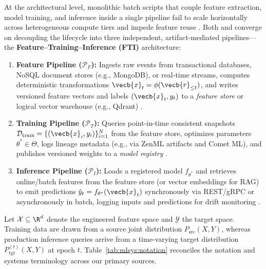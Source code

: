 \documentclass[../../../../master.tex]{subfiles}
\begin{document}
At the architectural level, monolithic batch scripts that couple feature extraction, model training, and inference inside a single pipeline fail to scale horizontally across heterogeneous compute tiers and impede feature reuse . Both  and  converge on decoupling the lifecycle into three independent, artifact-mediated pipelines---the \textbf{Feature--Training--Inference (FTI)} architecture:
\begin{enumerate}
  \item \textbf{Feature Pipeline ($\mathcal{P}_F$):} Ingests raw events from transactional databases, NoSQL document stores (e.g., MongoDB), or real-time streams, computes deterministic transformations $\vecb{x}_t = \phi(\vecb{r}_{\le t})$, and writes versioned feature vectors and labels $(\vecb{x}_t, y_t)$ to a \emph{feature store} or logical vector warehouse (e.g., Qdrant) .
  \item \textbf{Training Pipeline ($\mathcal{P}_T$):} Queries point-in-time consistent snapshots $\mathcal{D}_{\mathrm{train}} = \{(\vecb{x}_i, y_i)\}_{i=1}^N$ from the feature store, optimizes parameters $\theta^* \in \Theta$, logs lineage metadata (e.g., via ZenML artifacts and Comet ML), and publishes versioned weights to a \emph{model registry} .
  \item \textbf{Inference Pipeline ($\mathcal{P}_I$):} Loads a registered model $f_{\theta^*}$ and retrieves online/batch features from the feature store (or vector embeddings for RAG) to emit predictions $\hat{y}_t = f_{\theta^*}(\vecb{x}_t)$ synchronously via REST/gRPC or asynchronously in batch, logging inputs and predictions for drift monitoring .
\end{enumerate}

Let $\mathcal{X} \subseteq \R^d$ denote the engineered feature space and $\mathcal{Y}$ the target space. Training data are drawn from a source joint distribution $P_{\mathrm{src}}(X, Y)$, whereas production inference queries arrive from a time-varying target distribution $P_{\mathrm{tgt}}^{(t)}(X, Y)$ at epoch $t$. Table~\ref{tab:mlsys:notation} reconciles the notation and systems terminology across our primary sources.
\end{document}
